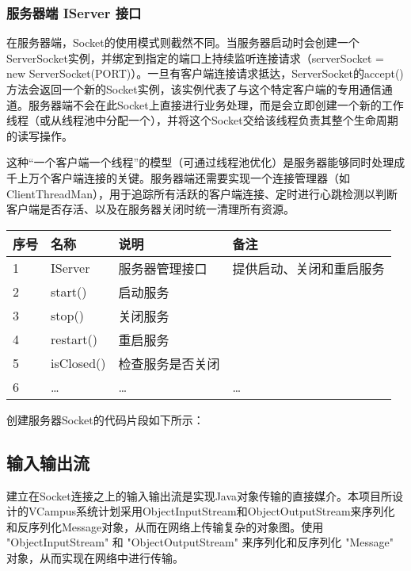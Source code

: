 \documentclass[a4paper]{ctexart}
\begin{document}
\subsubsection{服务器端 IServer 接口}
在服务器端，Socket的使用模式则截然不同。当服务器启动时会创建一个ServerSocket实例，并绑定到指定的端口上持续监听连接请求（serverSocket = new ServerSocket(PORT)）。一旦有客户端连接请求抵达，ServerSocket的accept()方法会返回一个新的Socket实例，该实例代表了与这个特定客户端的专用通信通道。服务器端不会在此Socket上直接进行业务处理，而是会立即创建一个新的工作线程（或从线程池中分配一个），并将这个Socket交给该线程负责其整个生命周期的读写操作。

这种“一个客户端一个线程”的模型（可通过线程池优化）是服务器能够同时处理成千上万个客户端连接的关键。服务器端还需要实现一个连接管理器（如ClientThreadMan），用于追踪所有活跃的客户端连接、定时进行心跳检测以判断客户端是否存活、以及在服务器关闭时统一清理所有资源。
\begin{tabular}{llll}
    \toprule
    \textbf{序号} & \textbf{名称} & \textbf{说明} & \textbf{备注}  \\
    \midrule
    1           & IServer     & 服务器管理接口     & 提供启动、关闭和重启服务 \\
    2           & start()     & 启动服务        &              \\
    3           & stop()      & 关闭服务        &              \\
    4           & restart()   & 重启服务        &              \\
    5           & isClosed()  & 检查服务是否关闭    &              \\
    6           & …           & …           & …            \\
    \bottomrule
\end{tabular}
\vspace{1em}

创建服务器Socket的代码片段如下所示：
\begin{comment}
\begin{lstlisting}
// 创建服务器Socket
serverSocket = new ServerSocket(IConstant.SERVER_PORT);
\end{lstlisting}
\end{comment}

\subsection{输入输出流}
建立在Socket连接之上的输入输出流是实现Java对象传输的直接媒介。本项目所设计的VCampus系统计划采用ObjectInputStream和ObjectOutputStream来序列化和反序列化Message对象，从而在网络上传输复杂的对象图。使用 "ObjectInputStream" 和 "ObjectOutputStream" 来序列化和反序列化 "Message" 对象，从而实现在网络中进行传输。
\end{document}
